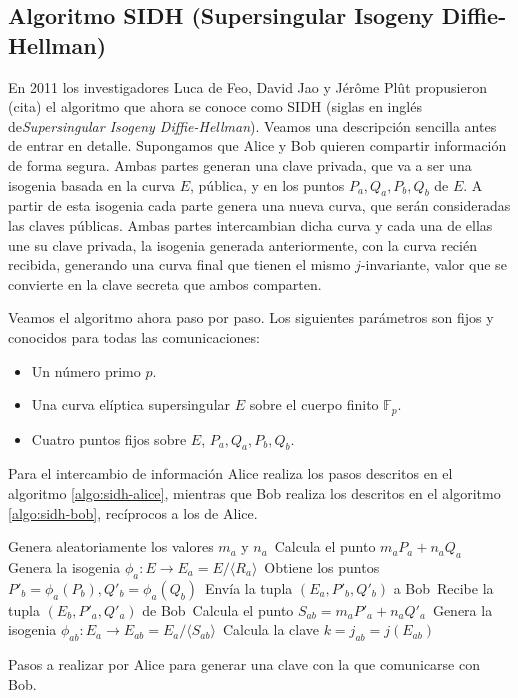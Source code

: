 \documentclass[
  a4paper,
  12pt,
  spanish,
]{scrartcl}
\begin{document}
\subsection{Algoritmo SIDH (Supersingular Isogeny Diffie-Hellman)}

En 2011 los investigadores Luca de Feo, David Jao y Jérôme Plût propusieron (cita) el algoritmo que ahora se conoce como SIDH (siglas en inglés de\textit{Supersingular Isogeny Diffie-Hellman}).
Veamos una descripción sencilla antes de entrar en detalle. 
Supongamos que Alice y Bob quieren compartir información de forma segura.
Ambas partes generan una clave privada, que va a ser una isogenia basada en la curva \(E\), pública, y en los puntos \(P_a, Q_a, P_b, Q_b\) de \(E\). 
A partir de esta isogenia cada parte genera una nueva curva, que serán consideradas las claves públicas.
Ambas partes intercambian dicha curva y cada una de ellas une su clave privada, la isogenia generada anteriormente, con la curva recién recibida, generando una
curva final que tienen el mismo \(j\)-invariante, valor que se convierte en la clave secreta que ambos comparten.

Veamos el algoritmo ahora paso por paso. Los siguientes parámetros son fijos y conocidos para todas las comunicaciones:
\begin{itemize}
  \item Un número primo \(p\).
  \item Una curva elíptica supersingular \(E\) sobre el cuerpo finito \(\mathbb F_p\).
  \item Cuatro puntos fijos sobre \(E\), \(P_a, Q_a, P_b, Q_b\).
\end{itemize}
Para el intercambio de información Alice realiza los pasos descritos en el algoritmo \ref{algo:sidh-alice}, mientras que Bob realiza los descritos en el algoritmo \ref{algo:sidh-bob}, recíprocos a los de Alice.

\begin{algorithm}[h]
  Genera aleatoriamente los valores \(m_a\) y \(n_a\)\,\;
  Calcula el punto \(m_aP_a + n_aQ_a\)\,\;
  Genera la isogenia \(\phi_a: E \to E_a = E/\langle R_a \rangle\)\,\;
  Obtiene los puntos \(P'_b = \phi_a(P_b), Q'_b = \phi_a(Q_b)\)\,\;
  Envía la tupla \((E_a, P'_b, Q'_b)\) a Bob\,\;
  Recibe la tupla \((E_b, P'_a, Q'_a)\) de Bob\,\;
  Calcula el punto \(S_{ab} = m_aP'_a + n_aQ'_a\)\,\;
  Genera la isogenia \(\phi_{ab} : E_a \to E_{ab} = E_a/\langle S_{ab} \rangle\)\,\;
  Calcula la clave \(k = j_{ab} = j(E_{ab})\)\,\;
  
  \caption{Pasos a realizar por Alice para generar una clave con la que comunicarse con Bob.}
  \label{algo:sidh-alice}
\end{algorithm}
\end{document}
